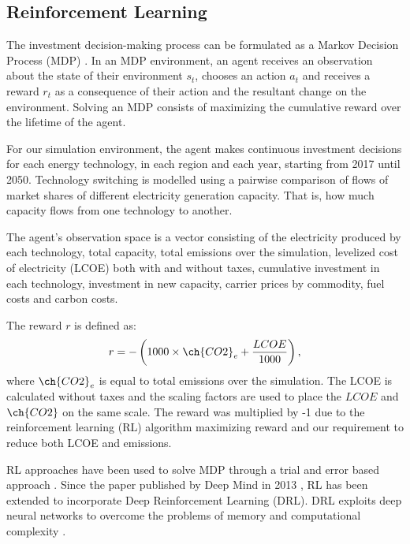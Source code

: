 \documentclass{article}
\begin{document}
\subsection*{Reinforcement Learning}

The investment decision-making process can be formulated as a Markov Decision Process (MDP) \cite{puterman2014markov}. In an MDP environment, an agent receives an observation about the state of their environment $s_t$, chooses an action $a_t$ and receives a reward $r_t$ as a consequence of their action and the resultant change on the environment. Solving an MDP consists of maximizing the cumulative reward over the lifetime of the agent. 


For our simulation environment, the agent makes continuous investment decisions for each energy technology, in each region and each year, starting from 2017 until 2050. Technology switching is modelled using a pairwise comparison of flows of market shares of different electricity generation capacity. That is, how much capacity flows from one technology to another. 

The agent's observation space is a vector consisting of the electricity produced by each technology, total capacity, total  emissions over the simulation, levelized cost of electricity (LCOE) both with and without taxes, cumulative investment in each technology, investment in new capacity, carrier prices by commodity, fuel costs and carbon costs.

The reward $r$ is defined as:
\begin{equation}
\label{eq:reward_function}
	r = -\left(1000\times\ch{CO2}_e + \frac{LCOE}{1000}\right),
\end{equation}
where $\ch{CO2}_e$ is equal to total  emissions over the simulation. The LCOE is calculated without taxes and the scaling factors are used to place the $LCOE$ and $\ch{CO2}$ on the same scale. The reward was multiplied by -1 due to the reinforcement learning (RL) algorithm maximizing reward and our requirement to reduce both LCOE and  emissions.


RL approaches have been used to solve MDP through a trial and error based approach \cite{Sutton2015}. Since the paper published by Deep Mind in 2013 \cite{Arulkumaran2017}, RL has been extended to incorporate Deep Reinforcement Learning (DRL). DRL exploits deep neural networks to overcome the problems of memory and computational complexity \cite{Arulkumaran2017}. 
\end{document}
